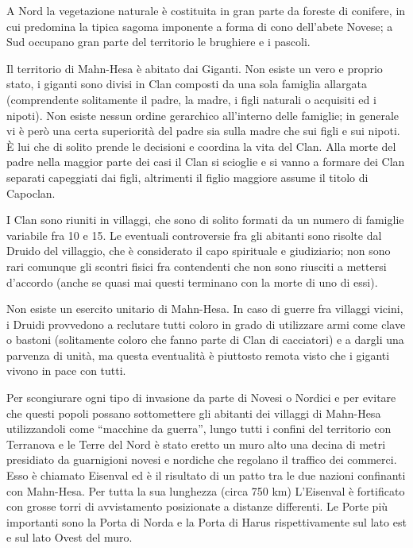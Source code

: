 A Nord la vegetazione naturale \`e costituita in gran parte da foreste
di conifere, in cui predomina la tipica sagoma imponente a forma di
cono dell'abete Novese; a Sud occupano gran parte del territorio le
brughiere e i pascoli.

\Politica Il territorio di Mahn-Hesa \`e abitato dai Giganti. Non esiste un
vero e proprio stato, i giganti sono divisi in Clan composti da una
sola famiglia allargata (comprendente solitamente il padre, la madre,
i figli naturali o acquisiti ed i nipoti). Non esiste nessun ordine
gerarchico all'interno delle famiglie; in generale vi \`e per\`o
una certa superiorit\`a del padre sia sulla madre che sui figli e
sui nipoti. \`E lui che di solito prende le decisioni e coordina la
vita del Clan. Alla morte del padre nella maggior parte dei casi il
Clan si scioglie e si vanno a formare dei Clan separati capeggiati dai
figli, altrimenti il figlio maggiore assume il titolo di Capoclan.

I Clan sono riuniti in villaggi, che sono di solito formati da un
numero di famiglie variabile fra 10 e 15. Le eventuali controversie
fra gli abitanti sono risolte dal Druido del villaggio, che \`e
considerato il capo spirituale e giudiziario; non sono rari comunque
gli scontri fisici fra contendenti che non sono riusciti a mettersi
d'accordo (anche se quasi mai questi terminano con la morte di uno di
essi).

\Esercito Non esiste un esercito unitario di Mahn-Hesa.  In caso di guerre fra
villaggi vicini, i Druidi provvedono a reclutare tutti coloro in grado
di utilizzare armi come clave o bastoni (solitamente coloro che fanno
\label{armigiganti} parte di Clan di cacciatori) e a dargli una
parvenza di unit\`a, ma questa eventualit\`a \`e piuttosto remota
visto che i giganti vivono in pace con tutti.

Per scongiurare ogni tipo di invasione da parte di Novesi o Nordici e
per evitare che questi popoli possano sottomettere gli abitanti dei
villaggi di Mahn-Hesa utilizzandoli come ``macchine da guerra'', lungo
tutti i confini del territorio con Terranova e le Terre del Nord \`e
stato eretto un muro alto una decina di metri presidiato da
guarnigioni novesi e nordiche che regolano il traffico dei commerci.
Esso \`e chiamato Eisenval ed \`e il risultato di un patto tra le
due nazioni confinanti con Mahn-Hesa. Per tutta la sua lunghezza
(circa 750 km) L'Eisenval \`e fortificato con grosse torri di
avvistamento posizionate a distanze differenti. Le Porte pi\`u
importanti sono la Porta di Norda e la Porta di Harus rispettivamente
sul lato est e sul lato Ovest del muro.

